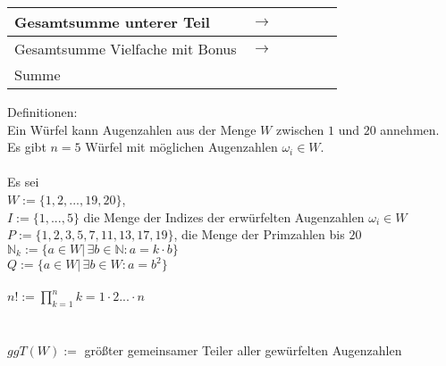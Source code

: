 \documentclass[a4paper,11pt]{exam}
\newcommand{\N} {\mathbb{N}}
\begin{document}
\begin{table}[h]
\begin{tabular}{|l|l|l|l|l|l|}
    \hline\hline
    Gesamtsumme unterer Teil       & $\longrightarrow$                                 &         &         &         &         \\
    \hline
    Gesamtsumme Vielfache mit Bonus & $\longrightarrow$                                 &         &         &         &         \\
    \hline\hline
    Summe                     &                                                   &         &         &         &         \\
    \hline
\end{tabular}
\end{table}

\vspace{10.5cm}
\noindent Definitionen: %
\vspace{0.5cm}
\\
Ein Würfel kann Augenzahlen aus der Menge $W$ zwischen $1$ und $20$ annehmen. \\
Es gibt $n = 5$ Würfel mit möglichen Augenzahlen $\omega_i \in W$.\\
\\
Es sei\\
$W := \{1, 2, ..., 19, 20 \}$, \\
$I :=\{1,...,5\}$  die Menge der Indizes der erwürfelten Augenzahlen $\omega_i \in W$\\
$P := %
 \{ 1,2,3,5,7,11,13,17,19\}$, die Menge der Primzahlen bis $20$
\\
$\N_k := \{ a \in W|\hspace{2pt} \exists b \in \N: a = k\cdot b \}$ \\
$Q := \{ a \in W | \hspace{2pt}\exists b \in W: a = b^2 \} $\\
\\
$n! := \displaystyle\prod_{k=1}^{n}k = 1 \cdot 2 ... \cdot n$\\
\\\\
$ggT(W) := $ größter gemeinsamer Teiler aller gewürfelten Augenzahlen\\
\\
\end{document}
